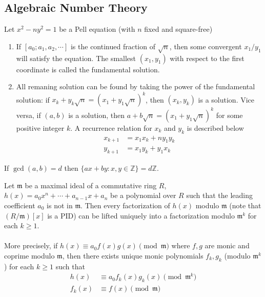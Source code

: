 \documentclass{treatise}
\begin{document}
\begin{shaded}
\chapter{Algebraic Number Theory}
\begin{theorem}
Let $x^2 - n y^2 = 1$ be a Pell equation (with $n$ fixed and square-free)
\begin{enumerate}
	\item If $[a_0; a_1, a_2, \cdots]$ is the continued fraction of $\sqrt{n}$, then some convergent $x_1/y_1$ will satisfy the equation. The smallest $(x_1, y_1)$ with respect to the first coordinate is called the fundamental solution.
	\item All remaning solution can be found by taking the power of the fundamental solution: if $x_k + y_k \sqrt{n} = (x_1 + y_1 \sqrt{n})^k$, then $(x_k, y_k)$ is a solution. Vice versa, if $(a, b)$ is a solution, then $a + b \sqrt{n} = (x_1 + y_1 \sqrt{n})^k$ for some positive integer $k$. A recurrence relation for $x_k$ and $y_k$ is described below
\begin{align*}
x_{k + 1} & = x_1 x_k + n y_1 y_k \\
y_{k + 1} & = x_1 y_k + y_1 x_k
\end{align*}
\end{enumerate}
\end{theorem}
\begin{lemma}
If $\gcd(a, b) = d$ then $\{ ax + by : x, y \in \mathbb{Z} \} = d \mathbb{Z}$.
\end{lemma}
\begin{lemma}
Let $\mathfrak{m}$ be a maximal ideal of a commutative ring $R$, $h(x) = a_0 x^n + \cdots + a_{n - 1} x + a_n$ be a polynomial over $R$ such that the leading coefficient $a_0$ is not in $\mathfrak{m}$. Then every factorization of $h(x)$ modulo $\mathfrak{m}$ (note that $(R/\mathfrak{m})[x]$ is a PID) can be lifted uniquely into a factorization modulo $\mathfrak{m}^k$ for each $k \geq 1$.
\\
\\
More precisely, if $h(x) \equiv a_0 f(x) g(x) \pmod{\mathfrak{m}}$ where $f, g$ are monic and coprime modulo $\mathfrak{m}$, then there exists unique monic polynomials $f_k, g_k$ (modulo $\mathfrak{m}^k$) for each $k \geq 1$ such that
\begin{align*}
h(x) & \equiv a_0 f_k (x) g_k(x) \pmod{\mathfrak{m}^k} \\
f_k(x) & \equiv f(x) \pmod{\mathfrak{m}} \\

\end{align*}
\end{lemma}
\end{shaded}
\end{document}
